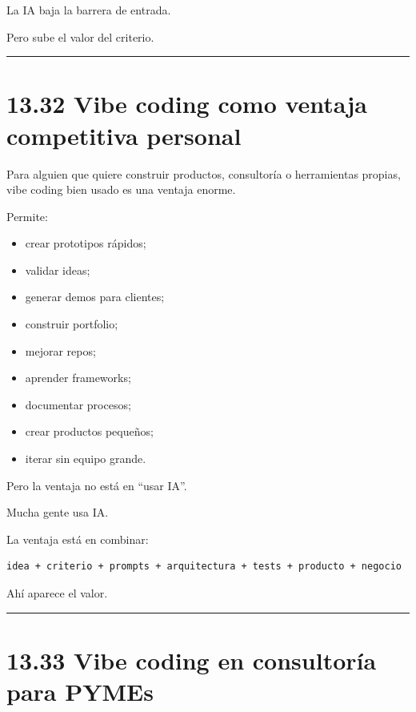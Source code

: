 La IA baja la barrera de entrada.

Pero sube el valor del criterio.

\begin{center}\rule{0.5\linewidth}{0.5pt}\end{center}

\section{13.32 Vibe coding como ventaja competitiva
personal}\label{vibe-coding-como-ventaja-competitiva-personal}

Para alguien que quiere construir productos, consultoría o herramientas
propias, vibe coding bien usado es una ventaja enorme.

Permite:

\begin{itemize}
\tightlist
\item
  crear prototipos rápidos;
\item
  validar ideas;
\item
  generar demos para clientes;
\item
  construir portfolio;
\item
  mejorar repos;
\item
  aprender frameworks;
\item
  documentar procesos;
\item
  crear productos pequeños;
\item
  iterar sin equipo grande.
\end{itemize}

Pero la ventaja no está en ``usar IA''.

Mucha gente usa IA.

La ventaja está en combinar:

\begin{lstlisting}
idea + criterio + prompts + arquitectura + tests + producto + negocio
\end{lstlisting}

Ahí aparece el valor.

\begin{center}\rule{0.5\linewidth}{0.5pt}\end{center}

\section{13.33 Vibe coding en consultoría para
PYMEs}\label{vibe-coding-en-consultoruxeda-para-pymes}

